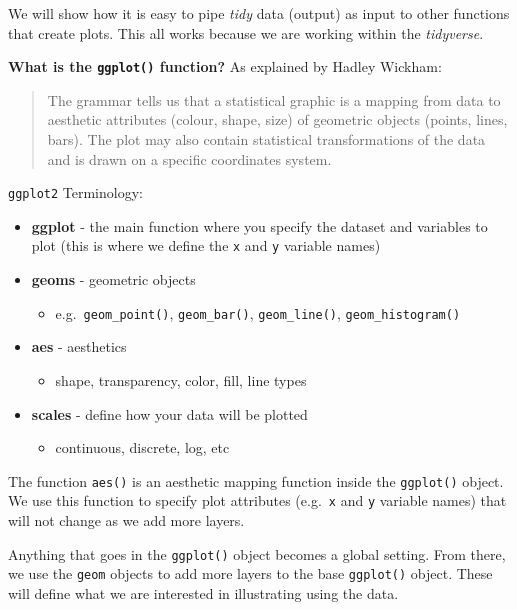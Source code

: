 \documentclass[
]{article}
\providecommand{\tightlist}{%
  \setlength{\itemsep}{0pt}\setlength{\parskip}{0pt}}
\begin{document}
We will show how it is easy to pipe \emph{tidy} data (output) as input
to other functions that create plots. This all works because we are
working within the \emph{tidyverse}.

\textbf{What is the \texttt{ggplot()} function?} As explained by Hadley
Wickham:

\begin{quote}
The grammar tells us that a statistical graphic is a mapping from data
to aesthetic attributes (colour, shape, size) of geometric objects
(points, lines, bars). The plot may also contain statistical
transformations of the data and is drawn on a specific coordinates
system.
\end{quote}

\texttt{ggplot2} Terminology:

\begin{itemize}
\tightlist
\item
  \textbf{ggplot} - the main function where you specify the dataset and
  variables to plot (this is where we define the \texttt{x} and
  \texttt{y} variable names)
\item
  \textbf{geoms} - geometric objects

  \begin{itemize}
  \tightlist
  \item
    e.g.~\texttt{geom\_point()}, \texttt{geom\_bar()},
    \texttt{geom\_line()}, \texttt{geom\_histogram()}
  \end{itemize}
\item
  \textbf{aes} - aesthetics

  \begin{itemize}
  \tightlist
  \item
    shape, transparency, color, fill, line types
  \end{itemize}
\item
  \textbf{scales} - define how your data will be plotted

  \begin{itemize}
  \tightlist
  \item
    continuous, discrete, log, etc
  \end{itemize}
\end{itemize}

The function \texttt{aes()} is an aesthetic mapping function inside the
\texttt{ggplot()} object. We use this function to specify plot
attributes (e.g.~\texttt{x} and \texttt{y} variable names) that will not
change as we add more layers.

Anything that goes in the \texttt{ggplot()} object becomes a global
setting. From there, we use the \texttt{geom} objects to add more layers
to the base \texttt{ggplot()} object. These will define what we are
interested in illustrating using the data.
\end{document}
